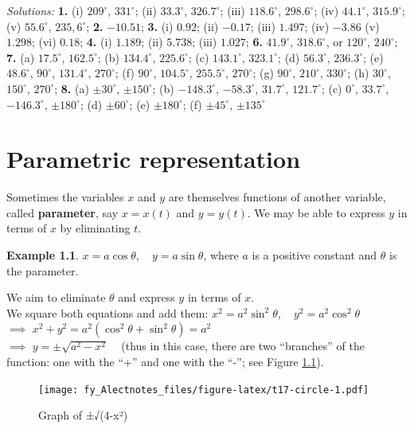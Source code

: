 \documentclass[
  12pt,
  oneside]{book}
\theoremstyle{definition}
\theoremstyle{definition}
\newtheorem{example}{Example}[chapter]
\theoremstyle{definition}
\theoremstyle{definition}
\theoremstyle{remark}
\begin{document}
\emph{Solutions:}
\textbf{1.} (i) \(209^\circ\), \(331^\circ\);
(ii) \(33.3^\circ\), \(326.7^\circ\);
(iii) \(118.6^\circ\), \(298.6^\circ\);
(iv) \(44.1^\circ\), \(315.9^\circ\);
(v) \(55.6^\circ\), \(235,6^\circ\);
\textbf{2.} \(-10.51\);
\textbf{3.} (i) \(0.92\);
(ii) \(-0.17\);
(iii) \(1.497\);
(iv) \(-3.86\)
(v) \(1.298\);
(vi) \(0.18\);
\textbf{4.} (i) \(1.189\);
(ii) \(5.738\);
(iii) \(1.027\);
\textbf{6.} \(41.9^\circ\), \(318.6^\circ\), or \(120^\circ\), \(240^\circ\);
\textbf{7.} (a) \(17.5^\circ\), \(162.5^\circ\);
(b) \(134.4^\circ\), \(225.6^\circ\);
(c) \(143.1^\circ\), \(323.1^\circ\);
(d) \(56.3^\circ\), \(236.3^\circ\);
(e) \(48.6^\circ\), \(90^\circ\), \(131.4^\circ\), \(270^\circ\);
(f) \(90^\circ\), \(104.5^\circ\), \(255.5^\circ\), \(270^\circ\);
(g) \(90^\circ\), \(210^\circ\), \(330^\circ\);
(h) \(30^\circ\), \(150^\circ\), \(270^\circ\);
\textbf{8.}
(a) \(\pm 30^\circ\), \(\pm150^\circ\);
(b) \(-148.3^\circ\), \(-58.3^\circ\), \(31.7^\circ\), \(121.7^\circ\);
(c) \(0^\circ\), \(33.7^\circ\), \(-146.3^\circ\), \(\pm180^\circ\);
(d) \(\pm 60^\circ\);
(e) \(\pm180^\circ\);
(f) \(\pm45^\circ\), \(\pm135^\circ\)

\hypertarget{parametric-representation}{%
\chapter{Parametric representation}\label{parametric-representation}}

Sometimes the variables \(x\) and \(y\) are themselves functions of another variable, called \textbf{parameter}, say \(x=x(t)\) and \(y=y(t)\). We may be able to express \(y\) in terms of \(x\) by eliminating \(t\).

\begin{example}
\(x=a\cos\theta\), ~ \(y=a\sin\theta\), where \(a\) is a positive constant and \(\theta\) is the parameter.
\end{example}

We aim to eliminate \(\theta\) and express \(y\) in terms of \(x\).\\
We square both equations and add them: \(x^2=a^2\sin^2\theta\), ~ \(y^2=a^2\cos^2\theta\)\\
\(\implies\) \(x^2+y^2=a^2(\cos^2\theta+\sin^2\theta) = a^2\)\\
\(\implies\) \(y=\pm\sqrt{a^2-x^2}\) ~ (thus in this case, there are two ``branches'' of the function: one with the ``+'' and one with the ``-''; see Figure \ref{fig:t17-circle}).

\begin{figure}
\centering
\texttt{[image: fy\_Alectnotes\_files/figure-latex/t17-circle-1.pdf]}
\caption{\label{fig:t17-circle}Graph of ±√(4-x²)}
\end{figure}
\end{document}
